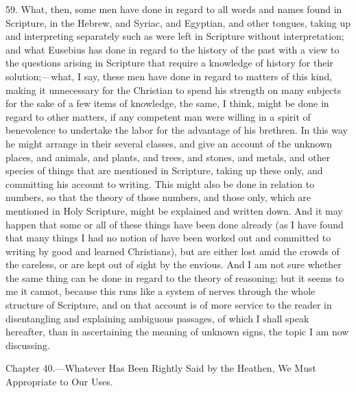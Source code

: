 59. What, then, some men have done in regard to all words and names found in Scripture, in the Hebrew, and Syriac, and Egyptian, and other tongues, taking up and interpreting separately such as were left in Scripture without interpretation; and what Eusebius has done in regard to the history of the past with a view to the questions arising in Scripture that require a knowledge of history for their solution;—what, I say, these men have done in regard to matters of this kind, making it unnecessary for the Christian to spend his strength on many subjects for the sake of a few items of knowledge, the same, I think, might be done in regard to other matters, if any competent man were willing in a spirit of benevolence to undertake the labor for the advantage of his brethren. In this way he might arrange in their several classes, and give an account of the unknown places, and animals, and plants, and trees, and stones, and metals, and other species of things that are mentioned in Scripture, taking up these only, and committing his account to writing. This might also be done in relation to numbers, so that the theory of those numbers, and those only, which are mentioned in Holy Scripture, might be explained and written down. And it may happen that some or all of these things have been done already (as I have found that many things I had no notion of have been worked out and committed to writing by good and learned Christians), but are either lost amid the crowds of the careless, or are kept out of sight by the envious. And I am not sure whether the same thing can be done in regard to the theory of reasoning; but it seems to me it cannot, because this runs like a system of nerves through the whole structure of Scripture, and on that account is of more service to the reader in disentangling and explaining ambiguous passages, of which I shall speak hereafter, than in ascertaining the meaning of unknown signs, the topic I am now discussing.


Chapter 40.—Whatever Has Been Rightly Said by the Heathen, We Must Appropriate to Our Uses.

